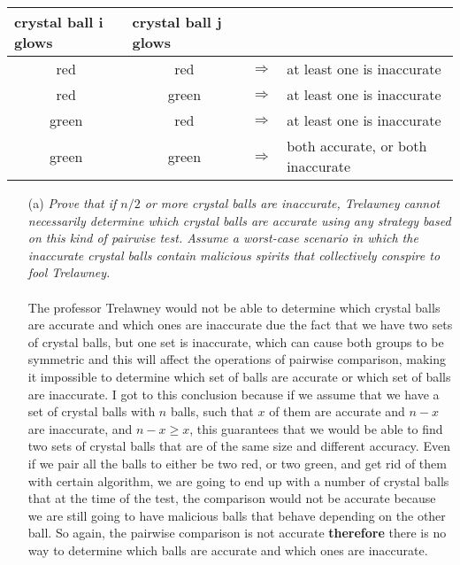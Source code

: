 \documentclass[12pt]{article} \setlength{\oddsidemargin}{0in}
\begin{document}
{\begin{center}
  \centering
  \begin{tabular}{ccll}
    \multicolumn{1}{l}{crystal ball i glows} & \multicolumn{1}{l}{crystal ball j glows}  &  \\ \hline
    red                                      & red                                       & $\Rightarrow$ & at least one is inaccurate \\
    red                                      & green                                     & $\Rightarrow$ & at least one is inaccurate \\
    green                                    & red                                       & $\Rightarrow$ & at least one is inaccurate \\
    green                                    & green                                     & $\Rightarrow$ & both accurate, or both inaccurate
  \end{tabular}
\end{center}

\begin{enumerate}
\item[(a)]{\textit{Prove that if $n/2$ or more crystal balls are inaccurate,	%
    Trelawney cannot necessarily determine which crystal balls are
    accurate using any strategy based on this kind of pairwise
    test. Assume a worst-case scenario in which the inaccurate crystal
    balls contain malicious spirits that collectively conspire to fool
    Trelawney.}}
  \\\\
 The professor Trelawney would not be able to determine which crystal balls are accurate and which ones are inaccurate due the fact that we have two sets of crystal balls, but one set is inaccurate, which can cause both groups to be symmetric and this will affect the operations of pairwise comparison, making it impossible to determine which set of balls are accurate or which set of balls are inaccurate. 
 I got to this conclusion because if we assume that we have a set of crystal balls with $n$ balls, such that $x$ of them are accurate and $n-x$ are inaccurate, and $n-x \geq x$, this guarantees that we would be able to find two sets of crystal balls that are of the same size and different accuracy. Even if we pair all the balls to either be two red, or two green, and get rid of them with certain algorithm, we are going to end up with a number of crystal balls that at the time of the test, the comparison would not be accurate because we are still going to have malicious balls that behave depending on the other ball. So again, the pairwise comparison is not accurate \textbf{therefore} there is no way to determine which balls are accurate and which ones are inaccurate.
   

\end{enumerate}}
\end{document}
